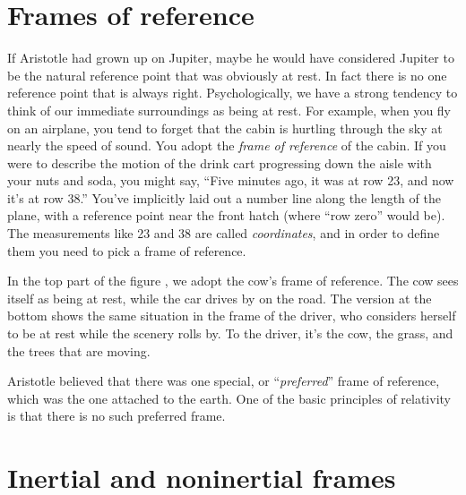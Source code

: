 \begin{figure}\label{fig:galileo-jovian-moons-sketch}
\end{figure}

\vfill\pagebreak

\section{Frames of reference}

If Aristotle had grown up on Jupiter, maybe he would have considered Jupiter to be the natural reference
point that was obviously at rest. In fact there is no one reference point that is always right. Psychologically,
we have a strong tendency to think of our immediate surroundings as being at rest. For example, when you fly
on an airplane, you tend to forget that the cabin is hurtling through the sky at nearly the speed of sound.
You adopt the \emph{frame of reference} of the cabin.
If you were to describe the motion of the drink cart progressing down the aisle with your nuts and soda,
you might say, ``Five minutes ago, it was at row 23, and now it's at row 38.'' You've implicitly laid out
a number line along the length of the plane, with a reference point near the front hatch (where ``row zero'' would be).
The measurements like 23 and 38 are called \emph{coordinates}, and in order to define them you need to pick
a frame of reference.

\begin{figure}\label{fig:cow-and-car}
\end{figure}

In the top part of the figure , we adopt the cow's frame of reference. The cow sees itself as being at rest,
while the car drives by on the road. The version at the bottom shows the same situation in
the frame of the driver,
who considers herself to be at rest while the scenery rolls by. To the driver, it's the cow, the grass, and
the trees that are moving.

Aristotle believed that there was one special, or ``\emph{preferred}'' frame of reference, which was
the one attached to the earth. One of the basic principles of relativity is that there is no such
preferred frame.

\vfill\pagebreak

\section{Inertial and noninertial frames}

